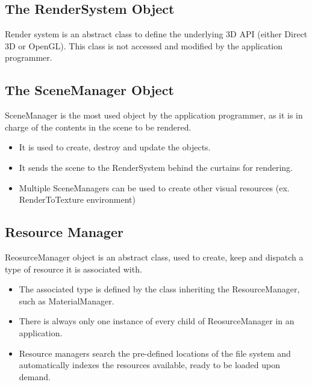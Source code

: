 \subsection{The RenderSystem Object}
Render system is an abstract class to define the underlying 3D API (either Direct 3D or OpenGL). This class is not accessed and modified by the application programmer.

\subsection{The SceneManager Object}
SceneManager is the most used object by the application programmer, as it is in charge of the contents in the scene to be rendered.
\begin{itemize}
\item It is used to create, destroy and update the objects.
\item It sends the scene to the RenderSystem behind the curtains for rendering.
\item Multiple SceneManagers can be used to create other visual resources (ex. RenderToTexture environment)
\end{itemize}

\subsection{Resource Manager}
ReosurceManager object is an abstract class, used to create, keep and dispatch a type of resource it is associated with. 
\begin{itemize}
\item The associated type is defined by the class inheriting the ResourceManager, such as MaterialManager.
\item There is always only one instance of every child of ReosurceManager in an application.
\item Resource managers search the pre-defined locations of the file system and automatically indexes the resources available, ready to be loaded upon demand.
\end{itemize}


